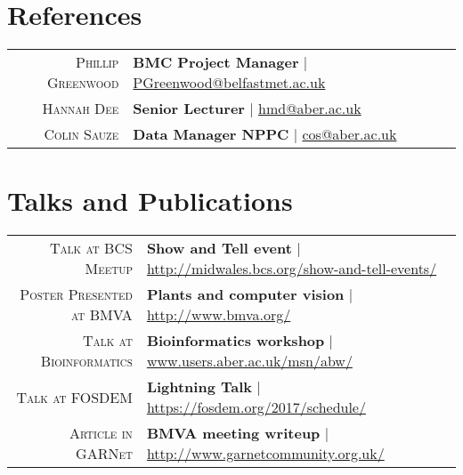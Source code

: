 \documentclass[a4paper,10pt]{article}
\begin{document}
\section{References}
\begin{tabular}{rl}	
  \textsc{Phillip Greenwood} & \textbf{BMC Project Manager} | \href{PGreenwood@belfastmet.ac.uk}{PGreenwood@belfastmet.ac.uk}
  \\
  \textsc{Hannah Dee} & \textbf{Senior Lecturer} | \href{hmd@aber.ac.uk}{hmd@aber.ac.uk}
  \\
  \textsc{Colin Sauze} & \textbf{Data Manager NPPC} | \href{cos@aber.ac.uk}{cos@aber.ac.uk}

\end{tabular}

\section{Talks and Publications}
\begin{tabular}{rl}	
  \textsc{Talk at BCS Meetup} & \textbf{Show and Tell event} | \href{www.midwales.bcs.org/show-and-tell-events/}{http://midwales.bcs.org/show-and-tell-events/}\\
  \textsc{Poster Presented at BMVA} & \textbf{Plants and computer vision} | \href{www.bmva.org/}{http://www.bmva.org/}\\
  \textsc{Talk at Bioinformatics} & \textbf{Bioinformatics workshop} | \href{www.users.aber.ac.uk/msn/abw/index.html}{www.users.aber.ac.uk/msn/abw/} \\
  \textsc{Talk at FOSDEM} & \textbf{Lightning Talk} | \href{https://fosdem.org/2017/schedule/}{https://fosdem.org/2017/schedule/}\\
  \textsc{Article in GARNet} & \textbf{BMVA meeting writeup} | \href{http://www.garnetcommunity.org.uk}{http://www.garnetcommunity.org.uk/}
                         
\end{tabular}



\end{document}
